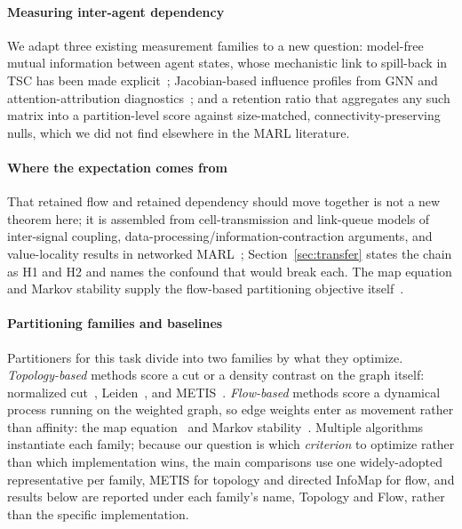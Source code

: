 \documentclass[journal]{IEEEtran}
\theoremstyle{definition}
\begin{document}
\paragraph{Measuring inter-agent dependency}
We adapt three existing measurement families to a new question: model-free mutual information between agent states, whose mechanistic link to spill-back in TSC has been made explicit~\citep{dependencydyn2025}; Jacobian-based influence profiles from GNN and attention-attribution diagnostics~\citep{lrd2025,abnar2020rollout,simonyan2013saliency,sundararajan2017axiomatic}; and a retention ratio that aggregates any such matrix into a partition-level score against size-matched, connectivity-preserving nulls, which we did not find elsewhere in the MARL literature.

\paragraph{Where the expectation comes from} That retained flow and retained dependency should move together is not a new theorem here; it is assembled from cell-transmission and link-queue models of inter-signal coupling, data-processing/information-contraction arguments, and value-locality results in networked
MARL~\citep{daganzo1994ctm,jin2012linkqueue,polyanskiy2017sdpi,evans1999percolation,qu2020average,qu2022scalable,congeduti2021iba}; Section~\ref{sec:transfer} states the chain as H1 and H2 and names the confound that would break each. The map equation and Markov stability supply the flow-based partitioning objective itself~\citep{rosvall2008maps,rosvall2009mapequation,delvenne2010stability,lambiotte2014multiscale}.

\paragraph{Partitioning families and baselines} Partitioners for this task divide into two families by what they optimize. \emph{Topology-based} methods score a cut or a density contrast on the graph itself: normalized cut~\citep{shimalik2000}, Leiden~\citep{traag2019leiden,traag2011cpm}, and METIS~\citep{karypis1998metis}. \emph{Flow-based} methods score a dynamical process running on the weighted graph, so edge weights enter as movement rather than affinity: the map equation~\citep{rosvall2008maps} and Markov stability~\citep{delvenne2010stability,lambiotte2014multiscale}. Multiple algorithms instantiate each family; because our question is which \emph{criterion} to optimize rather than which implementation wins, the main comparisons use one widely-adopted representative per family, METIS for topology and directed InfoMap for flow, and results below are reported under each family's name, Topology and Flow, rather than the specific implementation.
\end{document}
